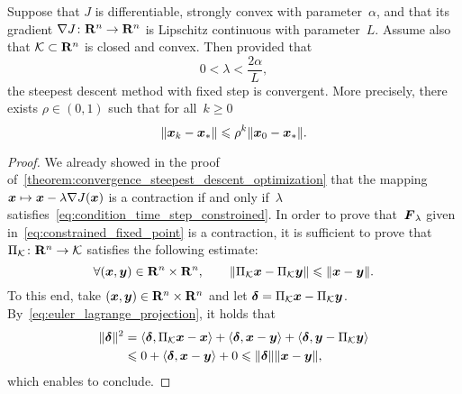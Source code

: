 \begin{theorem}
    \label{theorem:convergence_steepest_descent_optimization_constraint}
    Suppose that $J$ is differentiable, strongly convex with parameter~$\alpha$,
    and that its gradient $\nabla J \colon \mathbf R^n \to \mathbf R^n$ is Lipschitz continuous with parameter~$L$.
    Assume also that $\mathcal K \subset \mathbf R^n$ is closed and convex.
    Then provided that
    \begin{equation}
        \label{eq:condition_time_step_constroined}
        0 < \lambda < \frac{2 \alpha}{L},
    \end{equation}
    the steepest descent method with fixed step is convergent.
    More precisely,
    there exists $\rho \in (0, 1)$ such that for all~$k \geq 0$
    \begin{equation*}
        \lVert\mathbf{\boldsymbol{x}}_k - \mathbf{\boldsymbol{x}}_*\rVert \leqslant \rho^k \lVert\mathbf{\boldsymbol{x}}_0 - \mathbf{\boldsymbol{x}}_*\rVert.
    \end{equation*}
\end{theorem}
\begin{proof}
    We already showed in the proof of~\cref{theorem:convergence_steepest_descent_optimization} that the mapping $\mathbf{\boldsymbol{x}} \mapsto \mathbf{\boldsymbol{x}} - \lambda \nabla J(\mathbf{\boldsymbol{x}})$ is a contraction if and only if~$\lambda$ satisfies~\eqref{eq:condition_time_step_constroined}.
    In order to prove that~$\mathbf{\boldsymbol{F}}_{\lambda}$ given in~\eqref{eq:constrained_fixed_point} is a contraction,
    it is sufficient to prove that $\Pi_{\mathcal K} \colon \mathbf R^n \to \mathcal K$ satisfies the following estimate:
    \[
        \forall (\mathbf{\boldsymbol{x}}, \mathbf{\boldsymbol{y}}) \in \mathbf R^n \times \mathbf R^n, \qquad
        \lVert\Pi_{\mathcal K} \mathbf{\boldsymbol{x}} - \Pi_{\mathcal K} \mathbf{\boldsymbol{y}}\rVert \leqslant \lVert\mathbf{\boldsymbol{x}} - \mathbf{\boldsymbol{y}}\rVert.
    \]
    To this end, take $(\mathbf{\boldsymbol{x}}, \mathbf{\boldsymbol{y}}) \in \mathbf R^n \times \mathbf R^n$ and let $\mathbf{\boldsymbol{\delta}} = \Pi_{\mathcal K} \mathbf{\boldsymbol{x}} - \Pi_{\mathcal K} \mathbf{\boldsymbol{y}}$.
    By~\eqref{eq:euler_lagrange_projection},
    it holds that
    \begin{align*}
        \lVert\mathbf{\boldsymbol{\delta}}\rVert^2
        &= \langle\mathbf{\boldsymbol{\delta}}, \Pi_{\mathcal K} \mathbf{\boldsymbol{x}} - \mathbf{\boldsymbol{x}}\rangle + \langle\mathbf{\boldsymbol{\delta}}, \mathbf{\boldsymbol{x}} - \mathbf{\boldsymbol{y}}\rangle + \langle\mathbf{\boldsymbol{\delta}}, \mathbf{\boldsymbol{y}} - \Pi_{\mathcal K} \mathbf{\boldsymbol{y}}\rangle \\
        &\leqslant 0 + \langle\mathbf{\boldsymbol{\delta}}, \mathbf{\boldsymbol{x}} - \mathbf{\boldsymbol{y}}\rangle + 0 \leqslant \lVert\mathbf{\boldsymbol{\delta}}\rVert \lVert\mathbf{\boldsymbol{x}} - \mathbf{\boldsymbol{y}}\rVert,
    \end{align*}
    which enables to conclude.
\end{proof}
